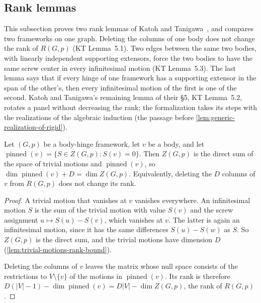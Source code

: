 \subsection{Rank lemmas}
\label{sec:molecular-rigidity-matrix-rank}

This subsection proves two rank lemmas of Katoh and
Tanigawa~\cite[\S5]{katohTanigawa2011}, and compares two frameworks on
one graph. Deleting the columns of one
body does not change the rank of $R(G,p)$ (KT Lemma~5.1). Two edges
between the same two bodies, with linearly independent supporting
extensors, force the two bodies to have the same screw center in every
infinitesimal motion (KT Lemma~5.3). The last lemma says that if every
hinge of one framework has a supporting extensor in the span of the
other's, then every infinitesimal motion of the first is one of the
second. Katoh and Tanigawa's remaining lemma of their \S5, KT
Lemma~5.2, rotates a panel without decreasing the rank; the
formalization takes its steps with the realizations of the algebraic
induction (the passage before
\cref{lem:generic-realization-of-rigid}).

\begin{lemma}
  \label{lem:rank-delete-vertex}
  \leanok
  Let $(G,p)$ be a body-hinge framework, let $v$ be a body, and let
  $\operatorname{pinned}(v) = \{S \in Z(G,p) : S(v) = 0\}$. Then
  $Z(G,p)$ is the direct sum of the space of trivial motions and
  $\operatorname{pinned}(v)$, so
  $\dim \operatorname{pinned}(v) + D = \dim Z(G,p)$. Equivalently,
  deleting the $D$ columns of $v$ from $R(G,p)$ does not change its
  rank.
\end{lemma}
\begin{proof}
  \leanok
  A trivial motion that vanishes at $v$ vanishes everywhere. An
  infinitesimal motion $S$ is the sum of the trivial motion with value
  $S(v)$ and the screw assignment $u \mapsto S(u) - S(v)$, which
  vanishes at $v$. The latter is again an infinitesimal motion, since it
  has the same differences $S(u) - S(w)$ as $S$. So $Z(G,p)$ is the
  direct sum, and the trivial motions have dimension $D$
  (\cref{lem:trivial-motions-rank-bound}).

  Deleting the columns of $v$ leaves the matrix whose null space
  consists of the restrictions to $V \setminus \{v\}$ of the motions in
  $\operatorname{pinned}(v)$. Its rank is therefore
  $D(|V|-1) - \dim \operatorname{pinned}(v) = D|V| - \dim Z(G,p)$, the
  rank of $R(G,p)$.
\end{proof}

